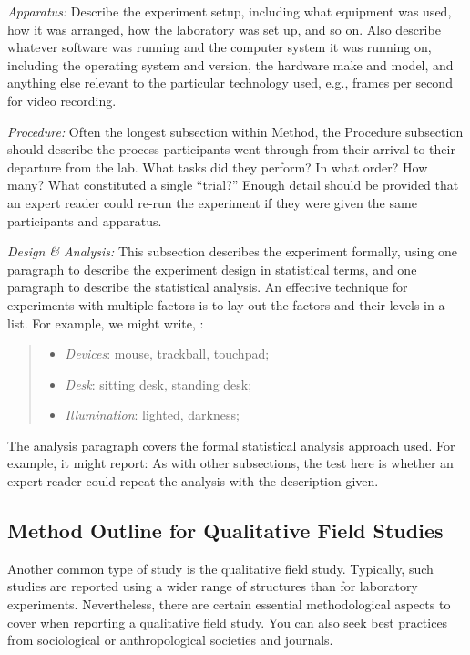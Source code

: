 \emph{Apparatus:} Describe the experiment setup, including what equipment was used, how it was arranged, how the laboratory was set up, and so on. 
Also describe whatever software was running and the computer system it was running on, including the operating system and version, the hardware make and model, and anything else relevant to the particular technology used, e.g., frames per second for video recording.

\emph{Procedure:} Often the longest subsection within Method, the Procedure subsection should describe the process participants went through from their arrival to their departure from the lab. What tasks did they perform? In what order?
How many? What constituted a single “trial?” Enough detail should be provided that an expert reader could re-run the experiment if they were given the same participants and apparatus.

\emph{Design \& Analysis:} This subsection describes the experiment formally, using one paragraph to describe the experiment design in statistical terms, and one paragraph to describe the statistical analysis. 
An effective technique for experiments with multiple factors is to lay out the factors and their levels in a list. 
For example, we might write, :
\begin{quote}
\begin{itemize}
    \item \emph{Devices}: mouse, trackball, touchpad;
    \item \emph{Desk}: sitting desk, standing desk;
    \item \emph{Illumination}: lighted, darkness;
\end{itemize}    
\end{quote}

The analysis paragraph covers the formal statistical analysis approach used. 
For example, it might report: 
As with other subsections, the test here is whether an expert reader could repeat the analysis with the description given.

\subsection{Method Outline for Qualitative Field Studies}
Another common type of study is the qualitative field study.
Typically, such studies are reported using a wider range of structures than for laboratory experiments. 
Nevertheless, there are certain essential methodological aspects to cover when reporting a qualitative field study. 
You can also seek best practices from sociological or anthropological societies and journals.

